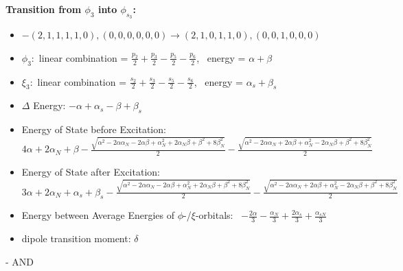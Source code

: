 \documentclass[12pt,a4paper]{article}
\begin{document}
        \noindent\textbf{Transition from $\phi_{3}$ into $\phi_{s_{3}}$:}
        \begin{itemize}
            \item $- (2, 1, 1, 1, 1, 0), (0, 0, 0, 0, 0, 0) \rightarrow (2, 1, 0, 1, 1, 0), (0, 0, 1, 0, 0, 0)$
        
            \item $\phi_{3}:$ linear combination = $\frac{p_{2}}{2} + \frac{p_{3}}{2} - \frac{p_{5}}{2} - \frac{p_{6}}{2}$, \
            energy = $\alpha + \beta$
            
            \item $\xi_{3}:$ linear combination = $\frac{s_{2}}{2} + \frac{s_{3}}{2} - \frac{s_{5}}{2} - \frac{s_{6}}{2}$, \
            energy = $\alpha_{s} + \beta_{s}$
            
            \item $\Delta$ Energy: $- \alpha + \alpha_{s} - \beta + \beta_{s}$
            \item Energy of State before Excitation: $4 \alpha + 2 \alpha_{N} + \beta - \frac{\sqrt{\alpha^{2} - 2 \alpha \alpha_{N} - 2 \alpha \beta + \alpha_{N}^{2} + 2 \alpha_{N} \beta + \beta^{2} + 8 \beta_{N}^{2}}}{2} - \frac{\sqrt{\alpha^{2} - 2 \alpha \alpha_{N} + 2 \alpha \beta + \alpha_{N}^{2} - 2 \alpha_{N} \beta + \beta^{2} + 8 \beta_{N}^{2}}}{2}$
            \item Energy of State after Excitation: $3 \alpha + 2 \alpha_{N} + \alpha_{s} + \beta_{s} - \frac{\sqrt{\alpha^{2} - 2 \alpha \alpha_{N} - 2 \alpha \beta + \alpha_{N}^{2} + 2 \alpha_{N} \beta + \beta^{2} + 8 \beta_{N}^{2}}}{2} - \frac{\sqrt{\alpha^{2} - 2 \alpha \alpha_{N} + 2 \alpha \beta + \alpha_{N}^{2} - 2 \alpha_{N} \beta + \beta^{2} + 8 \beta_{N}^{2}}}{2}$
            \item Energy between Average Energies of $\phi$-/$\xi$-orbitals: \
            $- \frac{2 \alpha}{3} - \frac{\alpha_{N}}{3} + \frac{2 \alpha_{s}}{3} + \frac{\alpha_{s N}}{3}$
        
            \item dipole transition moment: $\delta$
        
        \end{itemize}
        
 -  AND 
\end{document}
